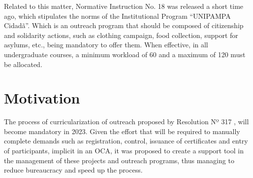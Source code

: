 Related to this matter, Normative Instruction No. 18 \cite{unipampacidada} was released a short time ago, which stipulates the norms of the Institutional Program ``UNIPAMPA Cidadã''. 
Which is an outreach program that should be composed of citizenship and solidarity actions, such as clothing campaign, food collection, support for asylums, etc., being mandatory to offer them. 
When effective, in all undergraduate courses, a minimum workload of 60 and a maximum of 120 must be allocated.

\section{Motivation}\label{sec:motivation}

The process of curricularization of outreach proposed by Resolution Nº 317 \cite{res317}, will become mandatory in 2023. Given the effort that will be required to manually complete demands such as registration, control, issuance of certificates and entry of participants, implicit in an \ac{OCA}, it was proposed to create a support tool in the management of these projects and outreach programs, thus managing to reduce bureaucracy and speed up the process.



